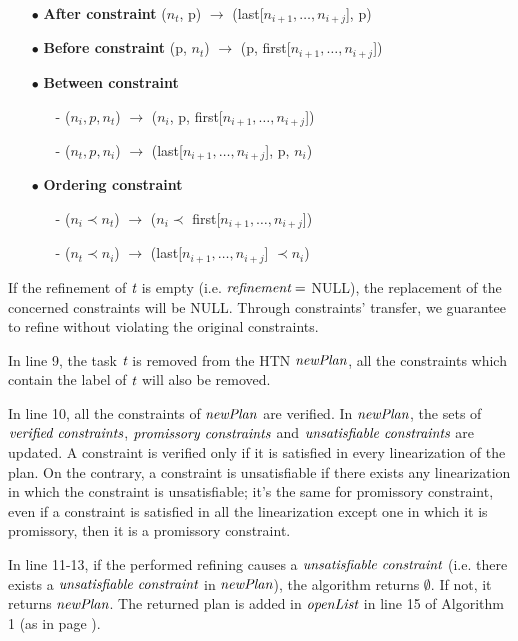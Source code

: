 \begin{itemize}
\item[$\bullet$] \textbf{After constraint} ($n_t$, p) $\rightarrow$ (last[$n_{i+1},\ldots ,n_{i+j}$], p)
\item[$\bullet$] \textbf{Before constraint} (p, $n_t$) $\rightarrow$ (p, first[$n_{i+1},\ldots ,n_{i+j}$])
\item[$\bullet$] \textbf{Between constraint} 
    \begin{itemize}
    \item[-] ($n_i, p, n_t$) $\rightarrow$ ($n_i$, p, first[$n_{i+1},\ldots ,n_{i+j}$])
    \item[-] ($n_t, p, n_i$) $\rightarrow$ (last[$n_{i+1},\ldots ,n_{i+j}$], p, $n_i$)
    \end{itemize}
\item[$\bullet$] \textbf{Ordering constraint}
    \begin{itemize}
    \item[-] ($n_i \prec n_t$) $\rightarrow$ ($n_i \prec$ first[$n_{i+1},\ldots ,n_{i+j}$])
    \item[-] ($n_t \prec n_i$) $\rightarrow$ (last[$n_{i+1},\ldots ,n_{i+j}$] $\prec n_i$)
    \end{itemize}
\end{itemize}

If the refinement of $\emph{t}$ is empty (i.e. $\emph{refinement} =$ NULL), the replacement of the concerned constraints will be NULL. Through  constraints’ transfer, we guarantee to refine without violating the original constraints.

In line 9, the task $\emph{t}$ is removed from the HTN $\emph{newPlan}$, all the constraints which contain the label of $\emph{t}$ will also be removed.

In line 10, all the constraints of $\emph{newPlan}$ are verified. In $\emph{newPlan}$, the sets of $\emph{verified constraints}$, $\emph{promissory constraints}$ and $\emph{unsatisfiable constraints}$ are updated. A constraint is verified only if it is satisfied in every linearization of the plan. On the contrary, a constraint is unsatisfiable if there exists any linearization in which the constraint is unsatisfiable; it’s the same for promissory constraint, even if a constraint is satisfied in all the linearization except one in which it is promissory, then it is a promissory constraint.

In line 11-13, if the performed refining causes a $\emph{unsatisfiable constraint}$ (i.e. there exists a $\emph{unsatisfiable constraint}$ in $\emph{newPlan}$), the algorithm returns $\emptyset$. If not, it returns $\emph{newPlan}$. The returned plan is added in $\emph{openList}$ in line 15 of Algorithm 1 (as in page \pageref{algo1}).

